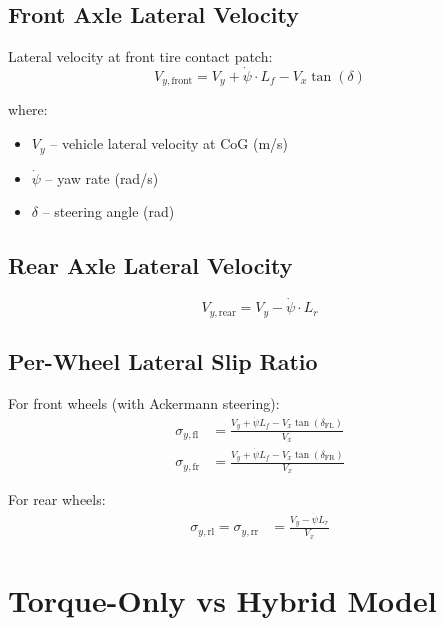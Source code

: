 \documentclass[11pt,a4paper]{article}
\begin{document}
\subsection{Front Axle Lateral Velocity}

Lateral velocity at front tire contact patch:
\begin{equation}
V_{y,\text{front}} = V_y + \dot{\psi} \cdot L_f - V_x \tan(\delta)
\end{equation}

where:
\begin{itemize}
    \item $V_y$ -- vehicle lateral velocity at CoG (m/s)
    \item $\dot{\psi}$ -- yaw rate (rad/s)
    \item $\delta$ -- steering angle (rad)
\end{itemize}

\subsection{Rear Axle Lateral Velocity}

\begin{equation}
V_{y,\text{rear}} = V_y - \dot{\psi} \cdot L_r
\end{equation}

\subsection{Per-Wheel Lateral Slip Ratio}

For front wheels (with Ackermann steering):
\begin{align}
\sigma_{y,\text{fl}} &= \frac{V_y + \dot{\psi} L_f - V_x \tan(\delta_{\text{FL}})}{V_x} \\
\sigma_{y,\text{fr}} &= \frac{V_y + \dot{\psi} L_f - V_x \tan(\delta_{\text{FR}})}{V_x}
\end{align}

For rear wheels:
\begin{align}
\sigma_{y,\text{rl}} = \sigma_{y,\text{rr}} &= \frac{V_y - \dot{\psi} L_r}{V_x}
\end{align}

\section{Torque-Only vs Hybrid Model}
\label{sec:comparison}
\end{document}
